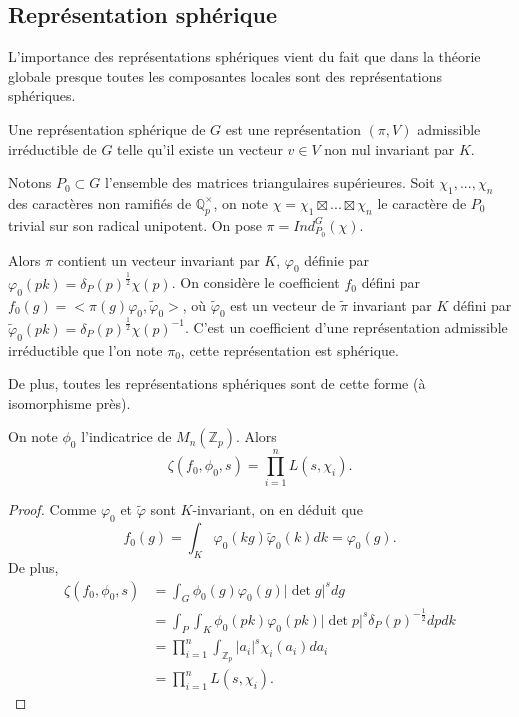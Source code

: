 \subsection{Représentation sphérique}

L'importance des représentations sphériques vient du fait que dans la théorie globale presque toutes les composantes locales sont des représentations sphériques.

\begin{definition}
Une représentation sphérique de $G$ est une représentation $(\pi, V)$ admissible irréductible de $G$ telle qu'il existe un vecteur $v \in V$ non nul invariant par $K$.
\end{definition}

Notons $P_0 \subset G$ l'ensemble des matrices triangulaires supérieures. Soit $\chi_1, ..., \chi_n$ des caractères non ramifiés de $\mathbb{Q}_p^\times$, on note $\chi = \chi_1 \boxtimes ... \boxtimes \chi_n$ le caractère de $P_0$ trivial sur son radical unipotent. On pose $\pi = Ind_{P_0}^G(\chi)$.

Alors $\pi$ contient un vecteur invariant par $K$, $\varphi_0$ définie par $\varphi_0(pk)=\delta_P(p)^{\frac{1}{2}}\chi(p)$. On considère le coefficient $f_0$ défini par $f_0(g)=<\pi(g)\varphi_0, \tilde{\varphi}_0>$, où $\tilde{\varphi}_0$ est un vecteur de $\tilde{\pi}$ invariant par $K$ défini par $\tilde{\varphi}_0(pk)=\delta_P(p)^{\frac{1}{2}}\chi(p)^{-1}$. C'est un coefficient d'une représentation admissible irréductible que l'on note $\pi_0$, cette représentation est sphérique.

De plus, toutes les représentations sphériques sont de cette forme (à isomorphisme près).

\begin{lemme}
On note $\phi_0$ l'indicatrice de $M_n(\mathbb{Z}_p)$. Alors
\begin{equation}
\zeta(f_0, \phi_0, s) = \prod_{i=1}^n L(s, \chi_i).
\end{equation}
\end{lemme}

\begin{proof}
Comme $\varphi_0$ et $\tilde{\varphi}$ sont $K$-invariant, on en déduit que
\begin{equation}
f_0(g)=\int_K \varphi_0(kg)\tilde{\varphi}_0(k)dk=\varphi_0(g).
\end{equation}
De plus,
\begin{align}
\zeta(f_0, \phi_0, s) &= \int_G \phi_0(g)\varphi_0(g)|\det g|^s dg \\
&= \int_P \int_K \phi_0(pk) \varphi_0(pk) |\det p|^s \delta_P(p)^{-\frac{1}{2}}dp dk \\
&= \prod_{i=1}^n \int_{\mathbb{Z}_p}|a_i|^s\chi_i(a_i)da_i \\
&= \prod_{i=1}^n L(s, \chi_i).
\end{align}
\end{proof}

